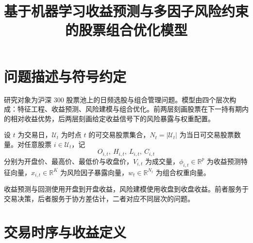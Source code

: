 \documentclass[12pt, a4paper, oneside]{article}
\title{\textbf{基于机器学习收益预测与多因子风险约束的股票组合优化模型}}
\author{}
\date{}
\begin{document}



\section{问题描述与符号约定}

研究对象为沪深 300 股票池上的日频选股与组合管理问题。模型由四个层次构成：特征工程、收益预测、风险建模与组合优化。前两层刻画股票在下一持有期内的相对收益优势，后两层刻画给定收益信号下的风险暴露与权重配置。

设 \(t\) 为交易日，\(\mathcal U_t\) 为时点 \(t\) 的可交易股票集合，\(N_t = |\mathcal U_t|\) 为当日可交易股票数量。对任意股票 \(i \in \mathcal U_t\)，记
\[
O_{i,t},\ H_{i,t},\ L_{i,t},\ C_{i,t}
\]
分别为开盘价、最高价、最低价与收盘价，\(V_{i,t}\) 为成交量，\(\phi_{i,t} \in \mathbb R^p\) 为收益预测特征向量，\(x_{i,t} \in \mathbb R^K\) 为风险因子暴露向量，\(w_t \in \mathbb R^{N_t}\) 为组合权重向量。

收益预测与回测使用开盘到开盘收益，风险建模使用收盘到收盘收益。前者服务于交易决策，后者服务于协方差估计，二者对应不同层次的问题。

\section{交易时序与收益定义}
\end{document}
